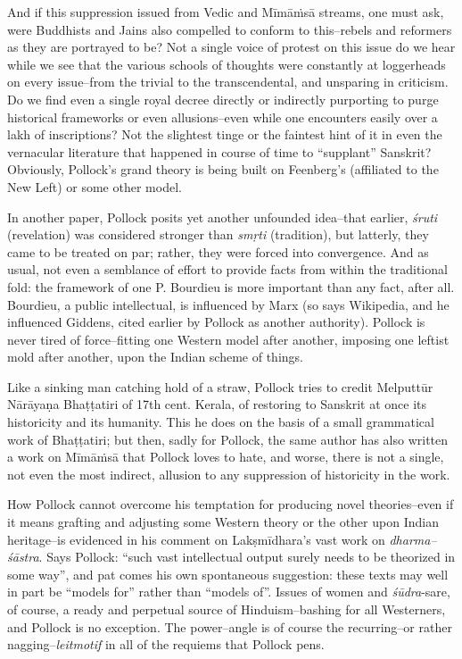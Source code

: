 And if this suppression issued from Vedic and Mīmāṁsā streams, one must ask, were Buddhists and Jains also compelled to conform to this–rebels and reformers as they are portrayed to be? Not a single voice of protest on this issue do we hear while we see that the various schools of thoughts were constantly at loggerheads on every issue–from the trivial to the transcendental, and unsparing in criticism. Do we find even a single royal decree directly or indirectly purporting to purge historical frameworks or even allusions–even while one encounters easily over a lakh of inscriptions? Not the slightest tinge or the faintest hint of it in even the vernacular literature that happened in course of time to “supplant” Sanskrit? Obviously, Pollock’s grand theory is being built on Feenberg’s (affiliated to the New Left) or some other model.

In another paper, Pollock posits yet another unfounded idea–that earlier, \textit{śruti} (revelation) was considered stronger than \textit{smṛti} (tradition), but latterly, they came to be treated on par; rather, they were forced into convergence. And as usual, not even a semblance of effort to provide facts from within the traditional fold: the framework of one P. Bourdieu is more important than any fact, after all. Bourdieu, a public intellectual, is influenced by Marx (so says Wikipedia, and he influenced Giddens, cited earlier by Pollock as another authority). Pollock is never tired of force–fitting one Western model after another, imposing one leftist mold after another, upon the Indian scheme of things.

Like a sinking man catching hold of a straw, Pollock tries to credit Melputtūr Nārāyaṇa Bhaṭṭatiri of 17th cent. Kerala, of restoring to Sanskrit at once its historicity and its humanity. This he does on the basis of a small grammatical work of Bhaṭṭatiri; but then, sadly for Pollock, the same author has also written a work on Mīmāṁsā that Pollock loves to hate, and worse, there is not a single, not even the most indirect, allusion to any suppression of historicity in the work.

How Pollock cannot overcome his temptation for producing novel theories–even if it means grafting and adjusting some Western theory or the other upon Indian heritage–is evidenced in his comment on Lakṣmīdhara’s vast work on \textit{dharma–śāstra}. Says Pollock: “such vast intellectual output surely needs to be theorized in some way”, and pat comes his own spontaneous suggestion: these texts may well in part be “models for” rather than “models of”. Issues of women and \textit{śūdra}-s\break are, of course, a ready and perpetual source of Hinduism–bashing for all Westerners, and Pollock is no exception. The power–angle is of course the recurring–or rather nagging–\textit{leitmotif} in all of the requiems that Pollock pens.

